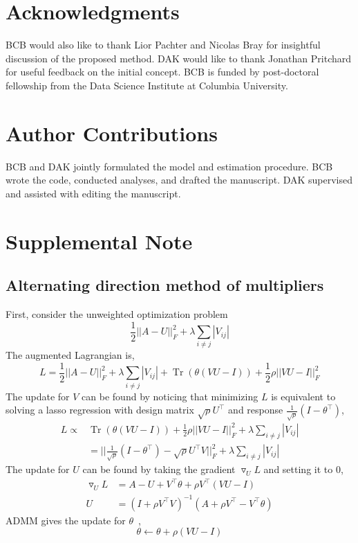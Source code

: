 \documentclass{article}
\DeclareMathOperator{\Tr}{Tr}
\newcommand{\beginsupplement}{%
        \setcounter{table}{0}
        \renewcommand{\thetable}{S\arabic{table}}%
        \setcounter{figure}{0}
        \renewcommand{\thefigure}{S\arabic{figure}}%
     }
\begin{document}
\section{Acknowledgments}
BCB would also like to thank Lior Pachter and Nicolas Bray for insightful discussion of the
proposed method. DAK would like to thank Jonathan Pritchard for useful feedback on the
initial concept. BCB is funded by post-doctoral fellowship from the Data Science Institute at
Columbia University.

\section{Author Contributions}
BCB and DAK jointly formulated the model and estimation procedure.
BCB wrote the code, conducted analyses, and drafted the manuscript.
DAK supervised and assisted with editing the manuscript.

\printbibliography

\beginsupplement
\section*{Supplemental Note}
\subsection*{Alternating direction method of multipliers}\label{note}
First, consider the unweighted optimization problem
\begin{equation}
\frac{1}{2} ||A - U||_F^2 + \lambda \sum_{i\neq j}|V_{ij}|
\end{equation}
The augmented Lagrangian is,
\begin{equation*}
L = \frac{1}{2} ||A - U||_F^2 +
   \lambda \sum_{i\neq j}|V_{ij}| +
   \Tr(\theta(VU-I)) + 
   \frac{1}{2} \rho ||VU-I||_F^2
\end{equation*}
The update for $V$ can be found by noticing that minimizing $L$ is equivalent
to solving a lasso regression with design matrix $\sqrt{\rho} U^\top$ and
response $\frac{1}{\sqrt{\rho}}(I-\theta^\top)$,
\begin{align*}
   L \propto& \Tr(\theta(VU-I)) + 
     \frac{1}{2} \rho ||VU-I||_F^2 + \lambda \sum_{i\neq j}|V_{ij}| \\
   &= ||\frac{1}{\sqrt{\rho}}(I-\theta^\top) -
      \sqrt{\rho} U^\top V||_F^2 + \lambda \sum_{i\neq j}|V_{ij}|
\end{align*}
The update for $U$ can be found by taking the gradient $\triangledown_U L$
and setting it to 0,
\begin{align*}
\triangledown_U L &= A - U + V^\top \theta + \rho V^\top(VU-I) \\
U &= (I + \rho V^{\top} V)^{-1}(A + \rho V^\top - V^\top \theta)
\end{align*}
ADMM gives the update for $\theta$~\cite{Boyd2010},
\begin{equation}
\theta \leftarrow \theta + \rho(VU-I)
\end{equation}
\end{document}
